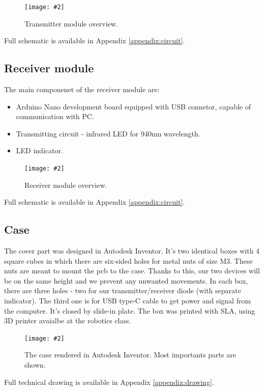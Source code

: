 \documentclass[12pt]{article}
\newcommand{\image}[3]{
\begin{figure}[h]
	\begin{center}
		\texttt{[image: \#2]}
	\end{center}
  \caption{#1}
\end{figure}}
\begin{document}
\image{Transmitter module overview.}{transmitter_overview.png}{0.2}

\noindent  Full schematic is available in Appendix \ref{appendix:circuit}.

\newpage
  \subsection{Receiver module}
  The main componenet of the receiver module are:
  \begin{itemize}
    \item Arduino Nano development board equipped with USB connetor, capable of communication with PC.
    \item Transmitting circuit - infrared LED for 940nm wavelength.
    \item LED indicator.
  \end{itemize}

\image{Receiver module overview.}{receiver_overview.png}{0.2}

\noindent  Full schematic is available in Appendix \ref{appendix:circuit}.
  \newpage
  \subsection{Case}
The cover part was designed in Autodesk Inventor. It's two identical boxes with 4 square cubes in which there are six-sided holes for metal nuts of size M3. 
These nuts are meant to mount the pcb to the case. Thanks to this, our two devices will be on the same height and we prevent any unwanted
movements. In each box, there are three holes - two for our transmitter/receiver diode (with separate indicator). The third one is for USB type-C cable to get 
power and signal from the computer. It's closed by slide-in plate. The box was printed with SLA, using 3D printer avaialbe at the robotics class.

\image{The case rendered in Autodesk Inventor. Most importants parts are shown.}{box.png}{0.4}

\noindent  Full technical drawing is available in Appendix \ref{appendix:drawing}.
\end{document}
